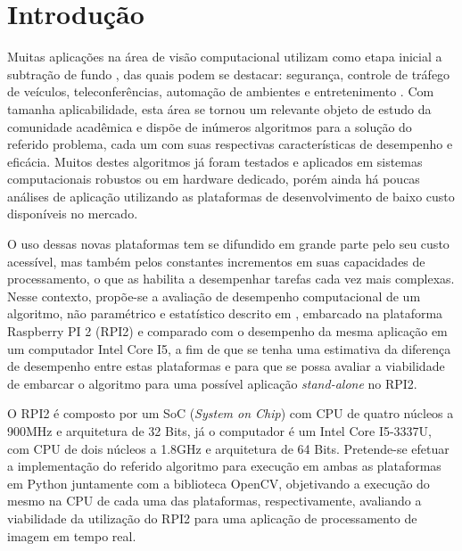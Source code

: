 \documentclass[conference]{IEEEtran}
\begin{document}




%
\IEEEpeerreviewmaketitle



\section{Introdução}
Muitas aplicações na área de visão computacional utilizam como etapa inicial a subtração de fundo \cite{IEEEhowto:sobral}, das quais podem se destacar: segurança, controle de tráfego de veículos, teleconferências, automação de ambientes e entretenimento \cite{IEEEhowto:parolin}. Com tamanha aplicabilidade, esta área se tornou um relevante objeto de estudo da comunidade acadêmica e dispõe de inúmeros algoritmos para a solução do referido problema, cada um com suas respectivas características de desempenho e eficácia. Muitos destes algoritmos já foram testados e aplicados em sistemas computacionais robustos ou em hardware dedicado\cite{IEEEhowto:oliveira}, porém ainda há poucas análises de aplicação utilizando as plataformas de desenvolvimento de baixo custo disponíveis no mercado.

O uso dessas novas plataformas tem se difundido em grande parte pelo seu custo acessível, mas também pelos constantes incrementos em suas capacidades de processamento, o que as habilita a desempenhar tarefas cada vez mais complexas. Nesse contexto, propõe-se a avaliação de desempenho computacional de um algoritmo, não paramétrico e estatístico descrito em \cite{IEEEhowto:horprasert}, embarcado na plataforma Raspberry PI 2 (RPI2) e comparado com o desempenho da mesma aplicação em um computador Intel Core I5, a fim de que se tenha uma estimativa da diferença de desempenho entre estas plataformas e para que se possa avaliar a viabilidade de embarcar o algoritmo para uma possível aplicação \textit{stand-alone} no RPI2.


O RPI2  é composto por um SoC (\textit{System on Chip}) com CPU de quatro núcleos a 900MHz e arquitetura de 32 Bits, já o computador é um Intel Core I5-3337U, com CPU de dois núcleos a 1.8GHz e arquitetura de 64 Bits. Pretende-se efetuar a implementação do referido algoritmo para execução em ambas as plataformas em Python juntamente com a biblioteca OpenCV, objetivando a execução do mesmo na CPU de cada uma das plataformas, respectivamente, avaliando a viabilidade da utilização do RPI2 para uma aplicação de processamento de imagem em tempo real.
\end{document}
